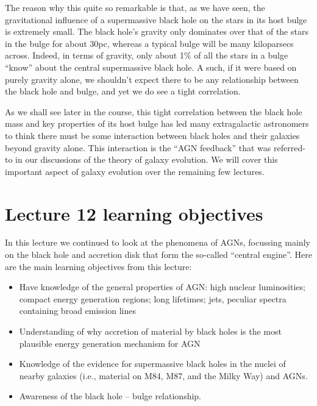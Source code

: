 \documentclass[11pt]{article}
\begin{document}
The reason why this quite so remarkable is that, as we have seen, the
gravitational influence of a supermassive black hole on the stars in
its host bulge is extremely small. The black hole's gravity only
dominates over that of the stars in the bulge for about 30pc, whereas
a typical bulge will be many kiloparsecs across. Indeed, in terms of
gravity, only about 1\% of all the stars in a bulge ``know'' about
the central supermassive black hole. A such, if it were based on
purely gravity alone, we shouldn't expect there to be any relationship
between the black hole and bulge, and yet we do see a tight
correlation.

As we shall see later in the course, this tight correlation between
the black hole mass and key properties of its host bulge has led many
extragalactic astronomers to think there must be some interaction
between black holes and their galaxies beyond gravity alone. This
interaction is the ``AGN feedback'' that was referred-to in our
discussions of the theory of galaxy evolution. We will cover this
important aspect of galaxy evolution over the remaining few lectures.

\section{Lecture 12 learning objectives}
In this lecture we continued to look at the phenomena of AGNs,
focussing mainly on the black hole and accretion disk that form the
so-called ``central engine''. Here are the main learning objectives
from this lecture:
\begin{itemize}
\item Have knowledge of the general properties of AGN: high nuclear
  luminosities; compact energy generation regions; long lifetimes;
  jets, peculiar spectra containing broad emission lines
\item Understanding of why accretion of material by black holes is the
  most plausible energy generation mechanism for AGN
\item Knowledge of the evidence for supermassive black holes in the
  nuclei of nearby galaxies (i.e., material on M84, M87, and the Milky
  Way) and AGNs.
\item Awareness of the black hole -- bulge relationship. 
\end{itemize}
\end{document}
